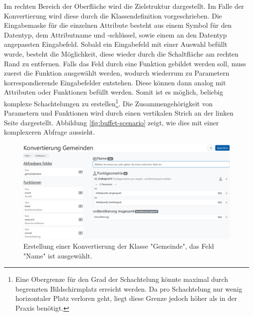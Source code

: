 Im rechten Bereich der Oberfläche wird die Zielstruktur dargestellt. Im Falle der Konvertierung wird diese durch die Klassendefinition vorgeschrieben. Die Eingabemaske für die einzelnen Attribute besteht aus einem Symbol für den Datentyp, dem Attributname und -schlüssel, sowie einem an den Datentyp angepassten Eingabefeld. Sobald ein Eingabefeld mit einer Auswahl befüllt wurde, besteht die Möglichkeit, diese wieder durch die Schaltfläche am rechten Rand zu entfernen. Falls das Feld durch eine Funktion gebildet werden soll, muss zuerst die Funktion ausgewählt werden, wodurch wiederrum zu Parametern korrespondierende Eingabefelder entstehen. Diese können dann analog mit Attributen oder Funktionen befüllt werden. Somit ist es möglich, beliebig komplexe Schachtelungen zu erstellen\footnote{Eine Obergrenze für den Grad der Schachtelung könnte maximal durch begrenzten Bildschirmplatz erreicht werden. Da pro Schachtelung nur wenig horizontaler Platz verloren geht, liegt diese Grenze jedoch höher als in der Praxis benötigt. }. Die Zusammengehörigkeit von Parametern und Funktionen wird durch einen vertikalen Strich an der linken Seite dargestellt. Abbildung \ref{fig:buffet-scenario} zeigt, wie dies mit einer komplexeren Abfrage aussieht.

\begin{figure}[ht]
  \begin{center}
    \includegraphics[width=.95\textwidth]{assets/buffet-selected.png}
  \end{center}
  \caption{Erstellung einer Konvertierung der Klasse "Gemeinde", das Feld "Name" ist ausgewählt.}
  \label{fig:buffet-selected}
\end{figure}

